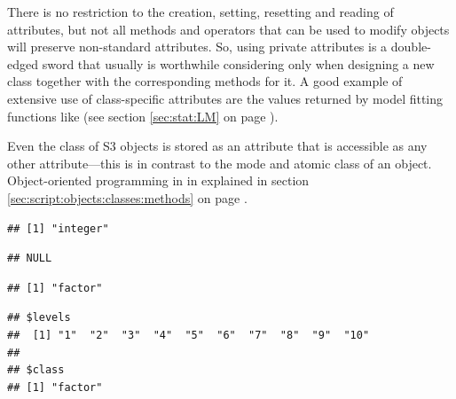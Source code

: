 \documentclass[krantz2]{krantz}\usepackage{knitr}
\begin{document}
\begin{warningbox}
There is no restriction to the creation, setting, resetting and reading of attributes, but not all methods and operators that can be used to modify objects will preserve non-standard attributes. So, using private attributes is a double-edged sword that usually is worthwhile considering only when designing a new class together with the corresponding methods for it. A good example of extensive use of class-specific attributes are the values returned by model fitting functions like  (see section \ref{sec:stat:LM} on page \pageref{sec:stat:LM}).

Even the class of S3 objects is stored as an attribute that is accessible as any other attribute---this is in contrast to the mode and atomic class of an object. Object-oriented programming in \Rlang in explained in section \ref{sec:script:objects:classes:methods} on page \pageref{sec:script:objects:classes:methods}.

\begin{knitrout}\footnotesize
{}\color{fgcolor}\begin{kframe}
\begin{alltt}
 \hlkwb{<-} \hlopt{:}
\end{alltt}
\begin{verbatim}
## [1] "integer"
\end{verbatim}
\begin{alltt}
\end{alltt}
\begin{verbatim}
## NULL
\end{verbatim}
\end{kframe}
\end{knitrout}

\begin{knitrout}\footnotesize
{}\color{fgcolor}\begin{kframe}
\begin{alltt}
 \hlkwb{<-} 
\end{alltt}
\begin{verbatim}
## [1] "factor"
\end{verbatim}
\begin{alltt}
\end{alltt}
\begin{verbatim}
## $levels
##  [1] "1"  "2"  "3"  "4"  "5"  "6"  "7"  "8"  "9"  "10"
## 
## $class
## [1] "factor"
\end{verbatim}
\end{kframe}
\end{knitrout}
\end{warningbox}
\end{document}
